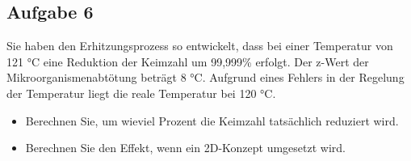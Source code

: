 \documentclass[a4paper,11pt]{article}
\newif\ifshowme
\begin{document}
\ifshowme
\antwort{

Mit: $x_1 = 10\% $ ; $x_2 = 20\%$ ; $x_3 = 30\% $ ; $m_1 = ? $ ; $m_2 = m_3 + m_1$ ; $m_3 = 100$ 
\begin{align*}
m_3x_3 + m_1x_1 			&= m_3x_2 + m_1x_2 \\
m_3x_3 + m_1x_1 - m_1x_2 	&= m_3x_2 \\
m_1x_1 - m_1x_2 			&= m_3x_2 - m_3x_3 \\
m_1(x_1 - x_2) 				&= m_3(x_2-x_3) \\
m_1 						&= \frac{m_3(x_2-x_3)}{x_1 - x_2} \\
m_1 						&= \frac{100(0,2-0,3)}{0,1 - 0,2} \\
&= 100
\end{align*}
}
\else
\fi

\subsection*{Aufgabe 6}
Sie haben den Erhitzungsprozess so entwickelt, dass bei einer Temperatur von 121 °C eine
Reduktion der Keimzahl um 99,999\% erfolgt. Der z-Wert der Mikroorganismenabtötung
beträgt 8 °C. Aufgrund eines Fehlers in der Regelung der Temperatur liegt die reale
Temperatur bei 120 °C. 
\begin{itemize}

\item Berechnen Sie, um wieviel Prozent die Keimzahl tatsächlich reduziert
wird.
\ifshowme
\antwort{

\begin{align*}
D_1 &= D_2 \cdot 10^{\frac{T_1-T_2}{z}} \\
D_1 &= 5 D \cdot 10^{\frac{120-121}{8}} \\
D_1 &= 3,75 \\
\\
1 - 1 \cdot 10^{-3,75} &= 0,99982
\end{align*}
}
\else
\fi

\item Berechnen Sie den Effekt, wenn ein 2D-Konzept umgesetzt wird.
\ifshowme
\antwort{
\begin{align*}
D_1 &= D_2 \cdot 10^{\frac{T_1-T_2}{z}} \\
D_1 &= 2 D \cdot 10^{\frac{120-121}{8}} \\
D_1 &= 1,4998 \\
\\
1 - 1 \cdot 10^{-1,4998} &= 0,96836
\end{align*}


}
\else
\fi

\end{itemize}
\end{document}
